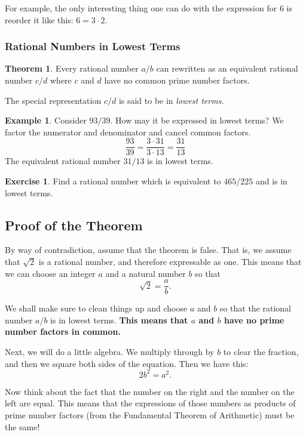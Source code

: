 \documentclass[12pt,letterpaper]{article}
\theoremstyle{definition}
\newtheorem{example}{Example}
\newtheorem{exercise}[question]{Exercise}
\newtheorem*{theorem}{Theorem}
\begin{document}
For example, the only interesting thing one can do with the expression for $6$ is reorder it like this: $6 = 3\cdot 2$.

\subsubsection*{Rational Numbers in Lowest Terms}

\begin{theorem}
Every rational number $a/b$ can rewritten as an equivalent rational number $c/d$ where $c$ and $d$ have no common prime number factors.
\end{theorem}

The special representation $c/d$ is said to be in \emph{lowest terms.}

\begin{example}
Consider $93/39$.
How may it be expressed in lowest terms?
We factor the numerator and denominator and cancel common factors.
\[
\frac{93}{39} = \frac{3 \cdot 31}{3\cdot 13} = \frac{31}{13}
\]
The equivalent rational number $31/13$ is in lowest terms.
\end{example}

\begin{exercise}
Find a rational number which is equivalent to $465/225$ and is in lowest terms.
\end{exercise}

\subsection*{Proof of the Theorem}

By way of contradiction, assume that the theorem is false.
That is, we assume that $\sqrt{2}$ is a rational number, and therefore expressable as one.
This means that we can choose an integer $a$ and a natural number $b$ so that 
\[
\sqrt{2} = \frac{a}{b}.
\]

We shall make sure to clean things up and choose $a$ and $b$ so that the rational number $a/b$ is in lowest terms.
\textbf{This means that $a$ and $b$ have no prime number factors in common.}

Next, we will do a little algebra.
We multiply through by $b$ to clear the fraction, and then we square both sides of the equation.
Then we have this:
\[ 
2b^2 = a^2.
\]

Now think about the fact that the number on the right and the number on the left are equal.
This means that the expressions of those numbers as products of prime number factors (from the Fundamental Theorem of Arithmetic) must be the same!
\end{document}
